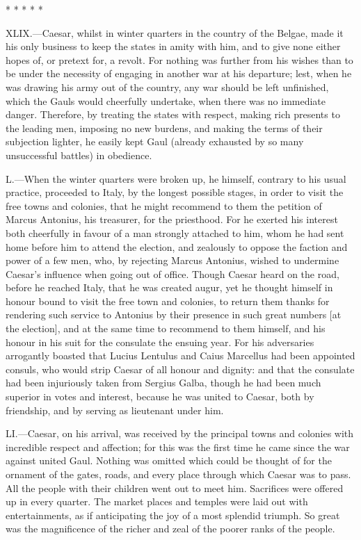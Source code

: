 * * * * *

XLIX.—Caesar, whilst in winter quarters in the country of the Belgae,
made it his only business to keep the states in amity with him, and to
give none either hopes of, or pretext for, a revolt. For nothing was
further from his wishes than to be under the necessity of engaging in
another war at his departure; lest, when he was drawing his army out of
the country, any war should be left unfinished, which the Gauls would
cheerfully undertake, when there was no immediate danger. Therefore, by
treating the states with respect, making rich presents to the leading
men, imposing no new burdens, and making the terms of their subjection
lighter, he easily kept Gaul (already exhausted by so many unsuccessful
battles) in obedience.

L.—When the winter quarters were broken up, he himself, contrary to his
usual practice, proceeded to Italy, by the longest possible stages, in
order to visit the free towns and colonies, that he might recommend to
them the petition of Marcus Antonius, his treasurer, for the priesthood.
For he exerted his interest both cheerfully in favour of a man strongly
attached to him, whom he had sent home before him to attend the
election, and zealously to oppose the faction and power of a few men,
who, by rejecting Marcus Antonius, wished to undermine Caesar's
influence when going out of office. Though Caesar heard on the road,
before he reached Italy, that he was created augur, yet he thought
himself in honour bound to visit the free town and colonies, to return
them thanks for rendering such service to Antonius by their presence in
such great numbers [at the election], and at the same time to recommend
to them himself, and his honour in his suit for the consulate the
ensuing year. For his adversaries arrogantly boasted that Lucius
Lentulus and Caius Marcellus had been appointed consuls, who would strip
Caesar of all honour and dignity: and that the consulate had been
injuriously taken from Sergius Galba, though he had been much superior
in votes and interest, because he was united to Caesar, both by
friendship, and by serving as lieutenant under him.

LI.—Caesar, on his arrival, was received by the principal towns and
colonies with incredible respect and affection; for this was the first
time he came since the war against united Gaul. Nothing was omitted
which could be thought of for the ornament of the gates, roads, and
every place through which Caesar was to pass. All the people with their
children went out to meet him. Sacrifices were offered up in every
quarter. The market places and temples were laid out with
entertainments, as if anticipating the joy of a most splendid triumph.
So great was the magnificence of the richer and zeal of the poorer ranks
of the people.


